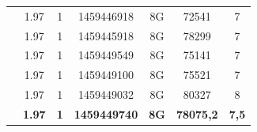 \documentclass[pdftex,12pt,a4paper]{report}
\begin{document}
\begin{table}[!htb]
{\begin{tabular}{l|c|c|c|c|c|c|}
                                                            & 1.97                                              & 1                                                  & 1459446918                                          & 8G                                         & 72541                                               & 7                                         \\ \cline{2-7} 
                                                            & 1.97                                              & 1                                                  & 1459445918                                          & 8G                                         & 78299                                               & 7                                         \\ \cline{2-7} 
                                                            & 1.97                                              & 1                                                  & 1459449549                                          & 8G                                         & 75141                                               & 7                                         \\ \cline{2-7} 
                                                            & 1.97                                              & 1                                                  & 1459449100                                          & 8G                                         & 75521                                               & 7                                         \\ \cline{2-7} 
                                                            & 1.97                                              & 1                                                  & 1459449032                                          & 8G                                         & 80327                                               & 8                                         \\ \hline
\rowcolor[HTML]{FFFC9E} 
\multicolumn{1}{|c|}{\cellcolor[HTML]{F8A102}\textbf{média}} & {\color[HTML]{333333} \textbf{1.97}}              & {\color[HTML]{333333} \textbf{1}}                  & {\color[HTML]{333333} \textbf{1459449740}}          & {\color[HTML]{333333} \textbf{8G}}         & {\color[HTML]{333333} \textbf{78075,2}}             & {\color[HTML]{333333} \textbf{7,5}}       \\ \hline
\end{tabular}}
\end{table}
\end{document}
